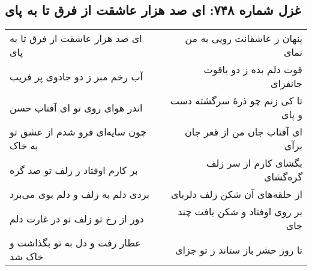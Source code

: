 \begin{center}
\section*{غزل شماره ۷۴۸: ای صد هزار عاشقت از فرق تا به پای}
\label{sec:748}
\begin{longtable}{l p{0.5cm} r}
ای صد هزار عاشقت از فرق تا به پای
&&
پنهان ز عاشقانت رویی به من نمای
\\
آب رخم مبر ز دو جادوی پر فریب
&&
قوت دلم بده ز دو یاقوت جانفزای
\\
اندر هوای روی تو ای آفتاب حسن
&&
تا کی زنم چو ذرهٔ سرگشته دست و پای
\\
چون سایه‌ای فرو شدم از عشق تو به خاک
&&
ای آفتاب جان من از قعر جان برآی
\\
بر کارم اوفتاد ز زلف تو صد گره
&&
بگشای کارم از سر زلف گره‌گشای
\\
بردی دلم به زلف و دلم بوی می‌برد
&&
از حلقه‌های آن شکن زلف دلربای
\\
دور از رخ تو زلف تو در غارت دلم
&&
بر روی اوفتاد و شکن یافت چند جای
\\
عطار رفت و دل به تو بگذاشت و خاک شد
&&
تا روز حشر باز ستاند ز تو جزای
\\
\end{longtable}
\end{center}
